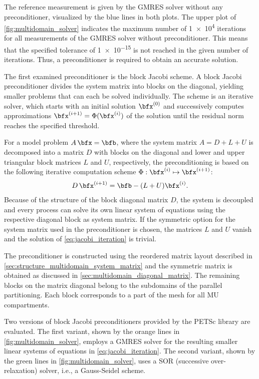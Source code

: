 The reference measurement is given by the GMRES solver without any preconditioner, visualized by the blue lines in both plots.
The upper plot of \cref{fig:multidomain_solver} indicates the maximum number of \num{1e4} iterations for all measurements of the GMRES solver without preconditioner. This means that the specified tolerance of \num{1e-15} is not reached in the given number of iterations. Thus, a preconditioner is required to obtain an accurate solution.

The first examined preconditioner is the block Jacobi scheme.
A block Jacobi preconditioner divides the system matrix into blocks on the diagonal, yielding smaller problems that can each be solved individually.
The scheme is an iterative solver, which starts with an initial solution $\bfx^{(0)}$ and successively computes  approximations $\bfx^{(i+1)} = \Phi(\bfx^{(i)})$ of the solution until the residual norm reaches the specified threshold.

For a model problem $A\,\bfx = \bfb$, where the system matrix $A=D+L+U$ is decomposed into a matrix $D$ with blocks on the diagonal and lower and upper triangular block matrices $L$ and $U$, respectively, the preconditioning is based on the following iterative computation scheme $\Phi: \bfx^{(i)} \mapsto \bfx^{(i+1)}$:
\begin{align}\label{eq:jacobi_iteration}
  D\,\bfx^{(i+1)} = \bfb - (L+U)\bfx^{(i)}.
\end{align}
Because of the structure of the block diagonal matrix $D$, the system is decoupled and every process can solve its own linear system of equations using the respective diagonal block as system matrix. If the symmetric option for the system matrix used in the preconditioner is chosen, the matrices $L$ and $U$ vanish and the solution of \cref{eq:jacobi_iteration} is trivial.

The preconditioner is constructed using the reordered matrix layout described in \cref{sec:structure_multidomain_system_matrix} and the symmetric matrix is obtained as discussed in \cref{sec:multidomain_diagonal_matrix}. The remaining blocks on the matrix diagonal belong to the subdomains of the parallel partitioning. Each block corresponds to a part of the mesh for all MU compartments.

Two versions of block Jacobi preconditioners provided by the PETSc library are evaluated.
The first variant, shown by the orange lines in \cref{fig:multidomain_solver}, employs a GMRES solver for the resulting smaller linear systems of equations in \cref{eq:jacobi_iteration}.
The second variant, shown by the green lines in \cref{fig:multidomain_solver}, uses a SOR (successive over-relaxation) solver, i.e., a Gauss-Seidel scheme.

